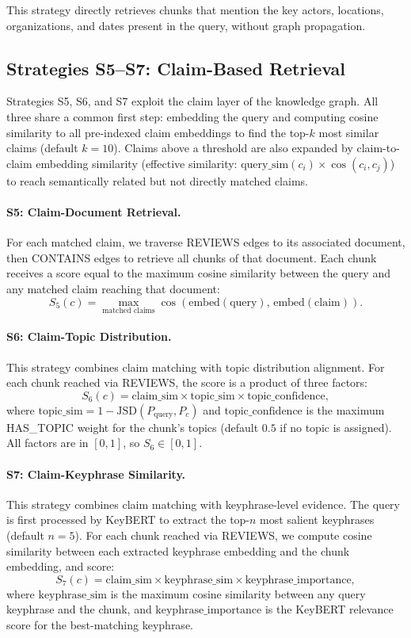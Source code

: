 \documentclass[10pt]{article}
\begin{document}
This strategy directly retrieves chunks that mention the key actors, locations,
organizations, and dates present in the query, without graph propagation.


\subsection{Strategies S5--S7: Claim-Based Retrieval}

Strategies S5, S6, and S7 exploit the claim layer of the knowledge graph. All three share a common first step: embedding the query and computing cosine similarity to all pre-indexed claim embeddings to find the top-$k$ most similar claims (default $k=10$). Claims above a threshold are also expanded by claim-to-claim embedding similarity (effective similarity: $\text{query\_sim}(c_i) \times \cos(c_i, c_j)$) to reach semantically related but not directly matched claims.

\paragraph{S5: Claim-Document Retrieval.} For each matched claim, we traverse REVIEWS edges to its associated document, then CONTAINS edges to retrieve all chunks of that document. Each chunk receives a score equal to the maximum cosine similarity between the query and any matched claim reaching that document:
\[
S_5(c) = \max_{\text{matched claims}} \cos(\text{embed}(\text{query}),\, \text{embed}(\text{claim})).
\]

\paragraph{S6: Claim-Topic Distribution.} This strategy combines claim matching with topic distribution alignment. For each chunk reached via REVIEWS, the score is a product of three factors:
\[
S_6(c) = \text{claim\_sim} \times \text{topic\_sim} \times \text{topic\_confidence},
\]
where $\text{topic\_sim} = 1 - \text{JSD}(P_{\text{query}}, P_c)$ and $\text{topic\_confidence}$ is the maximum HAS\_TOPIC weight for the chunk's topics (default $0.5$ if no topic is assigned). All factors are in $[0,1]$, so $S_6 \in [0,1]$.

\paragraph{S7: Claim-Keyphrase Similarity.} This strategy combines claim matching with keyphrase-level evidence. The query is first processed by KeyBERT to extract the top-$n$ most salient keyphrases (default $n=5$). For each chunk reached via REVIEWS, we compute cosine similarity between each extracted keyphrase embedding and the chunk embedding, and score:
\[
S_7(c) = \text{claim\_sim} \times \text{keyphrase\_sim} \times \text{keyphrase\_importance},
\]
where $\text{keyphrase\_sim}$ is the maximum cosine similarity between any query keyphrase and the chunk, and $\text{keyphrase\_importance}$ is the KeyBERT relevance score for the best-matching keyphrase.
\end{document}
